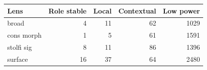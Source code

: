 {\small
\begin{tabular}{lrrrr}
\toprule
Lens & Role stable & Local & Contextual & Low power \\
\midrule
broad & 4 & 11 & 62 & 1029 \\
cons morph & 1 & 5 & 61 & 1591 \\
stolfi sig & 8 & 11 & 86 & 1396 \\
surface & 16 & 37 & 64 & 2480 \\
\bottomrule
\end{tabular}
}
